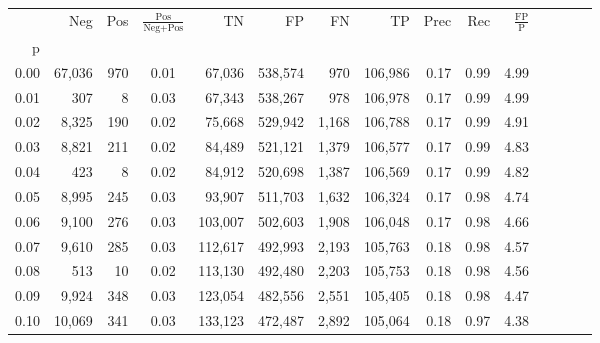\begin{tabular}{rrrcrrrrrrrrrrr}
\toprule
{} &     Neg &     Pos & $\frac{\text{Pos}}{\text{Neg}+\text{Pos}}$ &       TN &       FP &       FN &       TP &  Prec &   Rec & $\frac{\text{FP}}{\text{P}}$ \\
p    &         &         &                                            &          &          &          &          &       &       &                              \\
\midrule
0.00 &  67,036 &     970 &                                       0.01 &   67,036 &  538,574 &      970 &  106,986 &  0.17 &  0.99 &                         4.99 \\
0.01 &     307 &       8 &                                       0.03 &   67,343 &  538,267 &      978 &  106,978 &  0.17 &  0.99 &                         4.99 \\
0.02 &   8,325 &     190 &                                       0.02 &   75,668 &  529,942 &    1,168 &  106,788 &  0.17 &  0.99 &                         4.91 \\
0.03 &   8,821 &     211 &                                       0.02 &   84,489 &  521,121 &    1,379 &  106,577 &  0.17 &  0.99 &                         4.83 \\
0.04 &     423 &       8 &                                       0.02 &   84,912 &  520,698 &    1,387 &  106,569 &  0.17 &  0.99 &                         4.82 \\
0.05 &   8,995 &     245 &                                       0.03 &   93,907 &  511,703 &    1,632 &  106,324 &  0.17 &  0.98 &                         4.74 \\
0.06 &   9,100 &     276 &                                       0.03 &  103,007 &  502,603 &    1,908 &  106,048 &  0.17 &  0.98 &                         4.66 \\
0.07 &   9,610 &     285 &                                       0.03 &  112,617 &  492,993 &    2,193 &  105,763 &  0.18 &  0.98 &                         4.57 \\
0.08 &     513 &      10 &                                       0.02 &  113,130 &  492,480 &    2,203 &  105,753 &  0.18 &  0.98 &                         4.56 \\
0.09 &   9,924 &     348 &                                       0.03 &  123,054 &  482,556 &    2,551 &  105,405 &  0.18 &  0.98 &                         4.47 \\
0.10 &  10,069 &     341 &                                       0.03 &  133,123 &  472,487 &    2,892 &  105,064 &  0.18 &  0.97 &                         4.38 \\

\end{tabular}
